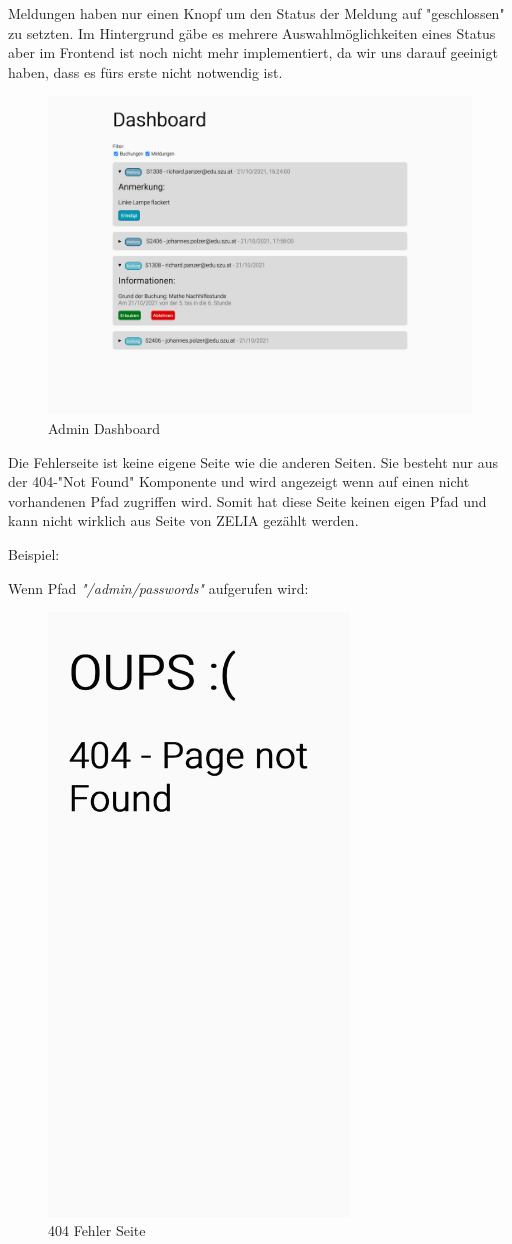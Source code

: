 Meldungen haben nur einen Knopf um den Status der Meldung auf "geschlossen" zu setzten. Im Hintergrund gäbe es mehrere Auswahlmöglichkeiten eines Status aber im Frontend ist noch nicht mehr implementiert, da wir uns darauf geeinigt haben, dass es fürs erste nicht notwendig ist.

\begin{figure}[H]
    \centering
    \includegraphics[width=120mm]{media/WebComponents/AdminSeite_light.png}
    \caption{Admin Dashboard}
\end{figure}


Die Fehlerseite ist keine eigene Seite wie die anderen Seiten. Sie besteht nur aus der 404-"Not Found" Komponente und wird angezeigt wenn auf einen nicht vorhandenen Pfad zugriffen wird. Somit hat diese Seite keinen eigen Pfad und kann nicht wirklich aus Seite von ZELIA gezählt werden.

Beispiel: 

Wenn Pfad \emph{"/admin/passwords"} aufgerufen wird:

\begin{figure}[H]
    \centering
    \includegraphics[width=80mm]{media/WebComponents/404.png}
    \caption{404 Fehler Seite}
\end{figure}